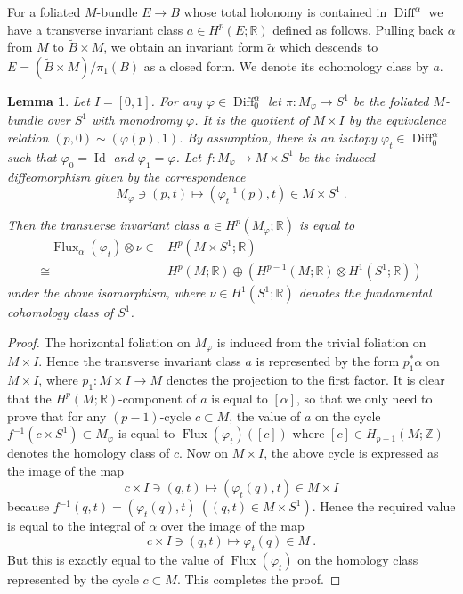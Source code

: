 \documentclass[12pt]{amsart}
\newtheorem{lemma}[theorem]{Lemma}
\theoremstyle{definition}
\theoremstyle{remark}
\def\varph{{\varphi}}
\def\ra{{\rightarrow}}
\def\bZ{{\mathbb Z}}
\def\bR{{\mathbb R}}
\def\inv{{^{-1}}}
\newcommand\Flux{\operatorname{Flux}}
\newcommand\Diff{\operatorname{Diff}}
\newcommand\id{\operatorname{Id}}
\begin{document}
For a foliated $M$-bundle $E\rightarrow B$ whose total holonomy is 
contained in $\Diff^{\alpha}$ we have a transverse invariant class 
$a\in H^{p}(E;\bR)$ defined as follows. Pulling back $\alpha$ from $M$ to 
$\tilde B\times M$, we obtain an invariant form $\tilde\alpha$ which descends 
to $E=(\tilde B\times M)/\pi_{1}(B)$ as a closed form. We denote its 
cohomology class by $a$.
\begin{lemma}\label{l:a}
Let $I=[0,1]$. For any $\varph\in\Diff^{\alpha}_{0}$ let
$\pi\colon M_{\varph}\ra S^1$ be the foliated $M$-bundle
over $S^1$ with monodromy $\varph$. It is the quotient
of $M\times I$ by the equivalence relation
$(p,0)\sim (\varph(p),1)$. By assumption,
there is an isotopy $\varph_{t}\in \Diff^{\alpha}_{0}$
such that $\varph_{0}=\id$ and $\varph_{1}=\varph$.
Let $f\colon M_{\varph}\rightarrow M\times S^1$ be the induced
diffeomorphism given by the correspondence
$$
M_{\varph}\ni (p,t) \longmapsto (\varph_{t}^{-1}(p),t)\in M\times
S^1 \ .
$$

Then the transverse invariant class $a\in H^{p}(M_{\varph};\bR)$ 
is equal to
\begin{align*}
[\alpha] + \Flux_{\alpha}(\varph_{t})\otimes\nu\in &H^{p}(M\times S^1;\bR)\\
\cong &H^{p}(M;\bR)\oplus (H^{p-1}(M;\bR)\otimes H^1(S^1;\bR))
\end{align*}
under the above isomorphism, where $\nu\in H^1(S^1;\bR)$
denotes the fundamental cohomology class of $S^1$.
\end{lemma}
\begin{proof}
The horizontal foliation on $M_{\varph}$ is induced from the trivial
foliation on $M\times I$. Hence the transverse invariant class $a$ 
is represented by the form $p_{1}^* \alpha$ on $M\times I$, where 
$p_{1}\colon M\times I\ra M$ denotes the projection to the first factor. 
It is clear that the $H^{p}(M;\bR)$-component of $a$ is equal to 
$[\alpha]$, so that we only need to prove that for any $(p-1)$-cycle 
$c \subset M$, the value of $a$ on the cycle 
$f\inv(c\times S^1) \subset M_{\varph}$ is equal to
$\Flux(\varph_{t})([c])$ where $[c]\in H_{p-1}(M;\bZ)$ denotes
the homology class of $c$. Now on $M\times I$, the above
cycle is expressed as the image of the map
$$
c\times I\ni (q,t)\longmapsto (\varph_t(q),t)\in M\times I
$$
because $f\inv(q,t)=(\varph_t(q),t)\ ((q,t)\in M\times S^1)$.
Hence the required value is equal to the integral of $\alpha$ over
the image of the map
$$
c\times I\ni (q,t)\longmapsto \varph_t(q)\in M \ .
$$
But this is exactly equal to the value of $\Flux(\varph_{t})$ on the
homology class represented by the cycle $c\subset M$.
This completes the proof.
\end{proof}
\end{document}
